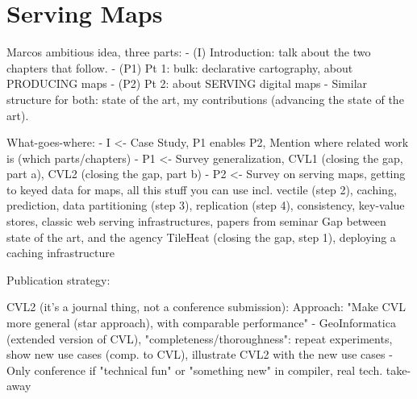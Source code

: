 \documentclass[11pt, oneside]{report}   	%
\begin{document}
\chapter{}


\part{Serving Maps}






Marcos ambitious idea, three parts:
- (I) Introduction: talk about the two chapters that follow. 
- (P1) Pt 1: bulk: declarative cartography, about PRODUCING maps
- (P2) Pt 2: about SERVING digital maps
- Similar structure for both: state of the art, my contributions (advancing the state of the art).  

What-goes-where:
- I <- Case Study, P1 enables P2, Mention where related work is (which parts/chapters)
- P1 <- 
        Survey generalization, 
        CVL1 (closing the gap, part a), 
        CVL2 (closing the gap, part b)
- P2 <- 
        Survey on serving maps, getting to keyed data for maps, all this stuff you can use 
                incl. vectile (step 2),
                caching,
                prediction,
                data partitioning (step 3), 
                replication (step 4), 
                consistency, 
                key-value stores, 
                classic web serving infrastructures,
                papers from seminar
        Gap between state of the art, and the agency
        TileHeat (closing the gap, step 1), deploying a caching infrastructure
        
Publication strategy:

CVL2 (it's a journal thing, not a conference submission):
Approach: "Make CVL more general (star approach), with comparable performance"
- GeoInformatica (extended version of CVL), "completeness/thoroughness": repeat experiments, show new use cases (comp. to CVL), illustrate CVL2 with the new use cases 
- Only conference if "technical fun" or "something new" in compiler, real tech. take-away
\end{document}
